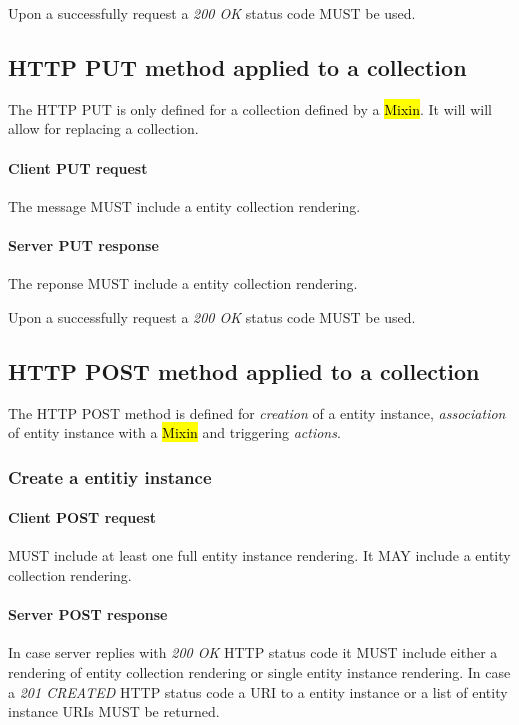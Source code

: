 \documentclass[10pt,a4paper]{article}
\begin{document}
Upon a successfully request a \emph{200 OK} status code MUST be used.

\subsection{HTTP PUT method applied to a collection}
The HTTP PUT is only defined for a collection defined by a \hl{Mixin}. It will will allow for replacing a collection.

\paragraph{Client PUT request}
The message MUST include a entity collection rendering.

\paragraph{Server PUT response}
The reponse MUST include a entity collection rendering.

Upon a successfully request a \emph{200 OK} status code MUST be used.

\subsection{HTTP POST method applied to a collection}
The HTTP POST method is defined for {\em creation} of a entity instance, {\em association} of entity instance with a \hl{Mixin} and triggering {\em actions}.

\subsubsection{Create a entitiy instance}

\paragraph{Client POST request}
MUST include at least one full entity instance rendering. It MAY include a entity collection rendering.

\paragraph{Server POST response}
In case server replies with \emph{200 OK} HTTP status code it MUST include either a rendering of entity collection rendering or single entity instance rendering. In case a \emph{201 CREATED} HTTP status code a URI to a entity instance or a list of entity instance URIs MUST be returned.
\end{document}
